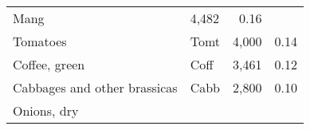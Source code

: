 \documentclass[]{article}
\begin{document}
\begin{longtable}[]{@{}llrr@{}}
\begin{minipage}[t]{0.16\columnwidth}
Mang\strut
\end{minipage} & \begin{minipage}[t]{0.12\columnwidth}\raggedleft\strut
4,482\strut
\end{minipage} & \begin{minipage}[t]{0.09\columnwidth}\raggedleft\strut
0.16\strut
\end{minipage}\tabularnewline
\begin{minipage}[t]{0.36\columnwidth}\raggedright\strut
Tomatoes\strut
\end{minipage} & \begin{minipage}[t]{0.16\columnwidth}\raggedright\strut
Tomt\strut
\end{minipage} & \begin{minipage}[t]{0.12\columnwidth}\raggedleft\strut
4,000\strut
\end{minipage} & \begin{minipage}[t]{0.09\columnwidth}\raggedleft\strut
0.14\strut
\end{minipage}\tabularnewline
\begin{minipage}[t]{0.36\columnwidth}\raggedright\strut
Coffee, green\strut
\end{minipage} & \begin{minipage}[t]{0.16\columnwidth}\raggedright\strut
Coff\strut
\end{minipage} & \begin{minipage}[t]{0.12\columnwidth}\raggedleft\strut
3,461\strut
\end{minipage} & \begin{minipage}[t]{0.09\columnwidth}\raggedleft\strut
0.12\strut
\end{minipage}\tabularnewline
\begin{minipage}[t]{0.36\columnwidth}\raggedright\strut
Cabbages and other brassicas\strut
\end{minipage} & \begin{minipage}[t]{0.16\columnwidth}\raggedright\strut
Cabb\strut
\end{minipage} & \begin{minipage}[t]{0.12\columnwidth}\raggedleft\strut
2,800\strut
\end{minipage} & \begin{minipage}[t]{0.09\columnwidth}\raggedleft\strut
0.10\strut
\end{minipage}\tabularnewline
\begin{minipage}[t]{0.36\columnwidth}\raggedright\strut
Onions, dry\strut
\end{minipage} & \begin{minipage}[t]{0.16\columnwidth}\raggedright\strut

\end{minipage}
\end{longtable}
\end{document}
